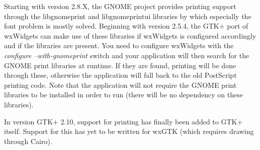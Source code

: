 Starting with version 2.8.X, the GNOME project provides printing
support through the libgnomeprint and libgnomeprintui libraries
by which especially the font problem is mostly solved. Beginning
with version 2.5.4, the GTK+ port of wxWidgets can make use of
these libraries if wxWidgets is configured accordingly and if the
libraries are present. You need to configure wxWidgets with the
{\it configure --with-gnomeprint} switch and your application will
then search for the GNOME print libraries at runtime. If they
are found, printing will be done through these, otherwise the
application will fall back to the old PostScript printing code.
Note that the application will not require the GNOME print libraries
to be installed in order to run (there will be no dependency on
these libraries).

In version GTK+ 2.10, support for printing has finally been
added to GTK+ itself. Support for this has yet to be written
for wxGTK (which requires drawing through Cairo).
